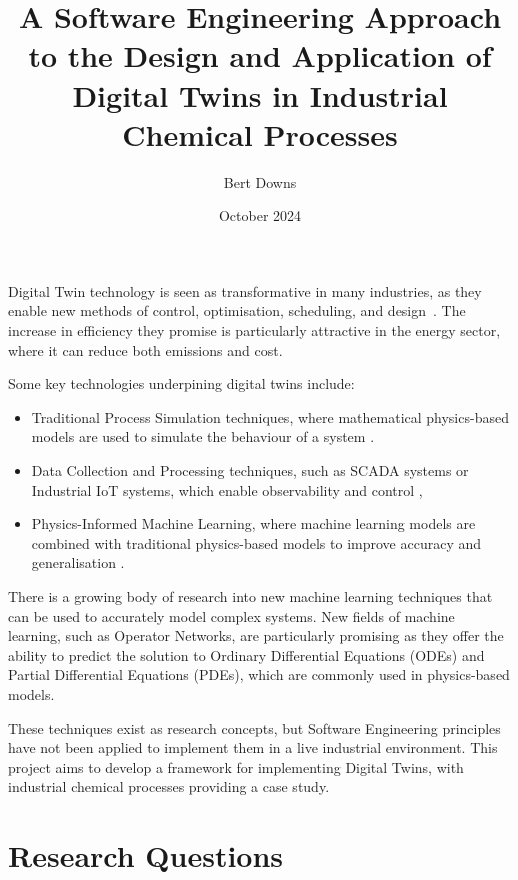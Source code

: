 \documentclass[12pt]{article}
\title{A Software Engineering Approach to the Design and Application of Digital Twins in Industrial Chemical Processes}
\author{Bert Downs }
\date{October 2024}
\begin{document}
\maketitle

Digital Twin technology is seen as transformative in many industries, as they enable new methods of control, optimisation, scheduling, and design~\cite{walmsley2024adaptive}. The increase in efficiency they promise is particularly attractive in the energy sector, where it can reduce both emissions and cost.

Some key technologies underpining digital twins include:

\begin{itemize}
    \item Traditional Process Simulation techniques, where mathematical physics-based models are used to simulate the behaviour of a system \cite{lee2021idaes}.
    \item Data Collection and Processing techniques, such as SCADA systems or Industrial IoT systems, which enable observability and control \cite{udugama2020role},
    \item Physics-Informed Machine Learning, where machine learning models are combined with traditional physics-based models to improve accuracy and generalisation \cite{karniadakis2021physics}.
\end{itemize}

There is a growing body of research into new machine learning techniques that can be used to accurately model complex systems. New fields of machine learning, such as Operator Networks, are particularly promising as they offer the ability to predict the solution to Ordinary Differential Equations (ODEs) and Partial Differential Equations (PDEs)\cite{lu2019deeponet}, which are commonly used in physics-based models.

These techniques exist as research concepts, but Software Engineering principles have not been applied to implement them in a live industrial environment. This project aims to develop a framework for implementing Digital Twins, with industrial chemical processes providing a case study.

\section*{Research Questions}

\end{document}
